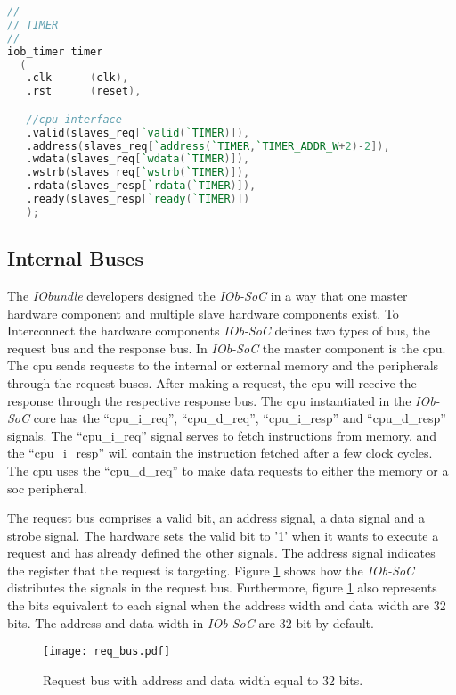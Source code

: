 \begin{lstlisting}[language=Verilog, caption={Example of the \enquote{inst.vh} file.}, label=lst:inst_file]
//
// TIMER
//
iob_timer timer
  (
   .clk      (clk),
   .rst      (reset),

   //cpu interface
   .valid(slaves_req[`valid(`TIMER)]),
   .address(slaves_req[`address(`TIMER,`TIMER_ADDR_W+2)-2]),
   .wdata(slaves_req[`wdata(`TIMER)]),
   .wstrb(slaves_req[`wstrb(`TIMER)]),
   .rdata(slaves_resp[`rdata(`TIMER)]),
   .ready(slaves_resp[`ready(`TIMER)])
   );
\end{lstlisting}

\subsection{Internal Buses}
\label{subsection:iob_bus}
The \textit{IObundle} developers designed the \textit{IOb-SoC} in a way that one master hardware component and multiple slave hardware components exist. To Interconnect the hardware components \textit{IOb-SoC} defines two types of bus, the request bus and the response bus. In \textit{IOb-SoC} the master component is the \acrshort{cpu}. The \acrshort{cpu} sends requests to the internal or external memory and the peripherals through the request buses. After making a request, the \acrshort{cpu} will receive the response through the respective response bus. The \acrshort{cpu} instantiated in the \textit{IOb-SoC} core has the \enquote{cpu\_i\_req}, \enquote{cpu\_d\_req}, \enquote{cpu\_i\_resp} and \enquote{cpu\_d\_resp} signals. The \enquote{cpu\_i\_req} signal serves to fetch instructions from memory, and the \enquote{cpu\_i\_resp} will contain the instruction fetched after a few clock cycles. The \acrshort{cpu} uses the \enquote{cpu\_d\_req} to make data requests to either the memory or a \acrshort{soc} peripheral.

The request bus comprises a valid bit, an address signal, a data signal and a strobe signal. The hardware sets the valid bit to '1' when it wants to execute a request and has already defined the other signals. The address signal indicates the register that the request is targeting. Figure \ref{fig:req_bus} shows how the \textit{IOb-SoC} distributes the signals in the request bus. Furthermore, figure \ref{fig:req_bus} also represents the bits equivalent to each signal when the address width and data width are 32 bits. The address and data width in \textit{IOb-SoC} are 32-bit by default.

\begin{figure}[!h]
    \centering
    \texttt{[image: req\_bus.pdf]}
    \caption{Request bus with address and data width equal to 32 bits.}
    \label{fig:req_bus}
\end{figure}

